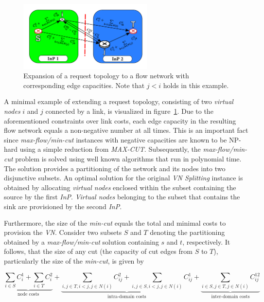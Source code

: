 \documentclass[prodmode,acmtomccap]{acmlarge}
\begin{document}
\begin{figure}[htb]
	\centering
	\includegraphics[width=0.6\textwidth]{maxflow}
	\caption{Expansion of a request topology to a flow network with corresponding edge capacities. Note that $j < i$ holds in this example.}
	\label{fig5}
\end{figure}

A minimal example of extending a request topology, consisting of two \emph{virtual nodes} $i$ and $j$ connected by a link, is visualized in figure~\ref{fig5}.
Due to the aforementioned constraints over link costs, each edge capacity in the resulting flow network equals a non-negative number at all times. This is an important fact since
\emph{max-flow/min-cut} instances with negative capacities are known to be NP-hard using a simple reduction from \emph{MAX-CUT}.
Subsequently, the \emph{max-flow/min-cut} problem is solved using well known algorithms that run in polynomial time. The solution provides a partitioning of the network and its nodes
into two disjunctive subsets. An optimal solution for the original \emph{VN Splitting} instance is obtained by allocating \emph{virtual nodes} enclosed within the subset containing the source by the first \emph{InP}.
\emph{Virtual nodes} belonging to the subset that contains the sink are provisioned by the second \emph{InP}.

Furthermore, the size of the \emph{min-cut} equals the total and minimal
costs to provision the \emph{VN}. Consider two subsets $S$ and $T$ denoting the partitioning obtained by a \emph{max-flow/min-cut} solution containing $s$ and $t$, respectively.
It follows, that the size of any cut (the capacity of cut edges from $S$ to $T$), particularly the size of the \emph{min-cut}, is given by

\normalsize

$$
	\underbrace{\sum\limits_{i \in S} C_i^1 + \sum\limits_{i \in T} C_i^2}_{\text{node costs}} + 
	\underbrace{\sum\limits_{i,j \in T, i < j, j \in N(i)} C_{ij}^2 + \sum\limits_{i,j \in S, i < j, j \in N(i)} C_{ij}^1}_{\text{intra-domain costs}}
	+\underbrace{\sum\limits_{i \in S, j \in T, j \in N(i)} C_{ij}^{12}}_{\text{inter-domain costs}}
$$
\end{document}
